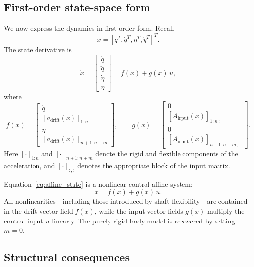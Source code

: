 \documentclass[12pt]{article}
\newcommand{\qd}{\dot{q}}
\newcommand{\qdd}{\ddot{q}}
\newcommand{\etad}{\dot{\eta}}
\newcommand{\etadd}{\ddot{\eta}}
\newcommand{\xd}{\dot{x}}
\begin{document}
\subsection{First-order state-space form}

We now express the dynamics in first-order form. Recall
\begin{equation}
  x = [q^{T}, \qd^{T}, \eta^{T}, \etad^{T}]^{T}.
\end{equation}
The state derivative is
\begin{equation}
  \xd =
  \begin{bmatrix}
    \qd \\[0.2em]
    \qdd \\[0.2em]
    \etad \\[0.2em]
    \etadd
  \end{bmatrix}
  =
  f(x) + g(x)\,u,
  \label{eq:affine_state}
\end{equation}
where
\begin{equation}
  f(x) =
  \begin{bmatrix}
    \qd \\[0.2em]
    [a_{\text{drift}}(x)]_{1:n} \\[0.2em]
    \etad \\[0.2em]
    [a_{\text{drift}}(x)]_{n+1:n+m}
  \end{bmatrix},
  \qquad
  g(x) =
  \begin{bmatrix}
    0 \\[0.2em]
    [A_{\text{input}}(x)]_{1:n,:} \\[0.2em]
    0 \\[0.2em]
    [A_{\text{input}}(x)]_{n+1:n+m,:}
  \end{bmatrix}.
\end{equation}
Here \([\cdot]_{1:n}\) and \([\cdot]_{n+1:n+m}\) denote the rigid and flexible components of the acceleration, and \([\cdot]_{:, :}\) denotes the appropriate block of the input matrix.

Equation~\eqref{eq:affine_state} is a nonlinear control-affine system:
\begin{equation}
  \xd = f(x) + g(x)\,u.
\end{equation}
All nonlinearities---including those introduced by shaft flexibility---are contained in the drift vector field \(f(x)\), while the input vector fields \(g(x)\) multiply the control input \(u\) linearly. The purely rigid-body model is recovered by setting \(m = 0\).

\subsection{Structural consequences}
\end{document}
